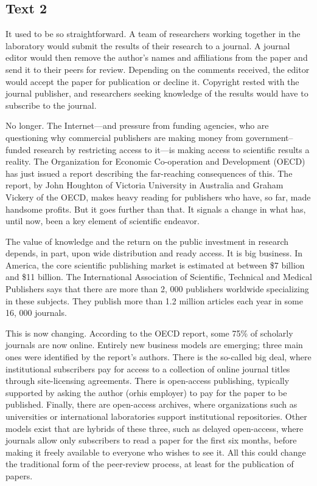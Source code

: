 \newpage
\subsection{Text 2}


It used to be so straightforward. A team of researchers working together
in the laboratory would submit the results of their research to a
journal. A journal editor would then remove the author's names and
affiliations from the paper and send it to their peers for review.
Depending on the comments received, the editor would accept the paper
for publication or decline it. Copyright rested with the journal
publisher, and researchers seeking knowledge of the results would have
to subscribe to the journal.

No longer. The Internet---and pressure from funding agencies, who are
questioning why commercial publishers are making money from
government--funded research by restricting access to it---is making
access to scientific results a reality. The Organization for Economic
Co-operation and Development (OECD) has just issued a report describing
the far-reaching consequences of this. The report, by John Houghton of
Victoria University in Australia and Graham Vickery of the OECD, makes
heavy reading for publishers who have, so far, made handsome profits.
But it goes further than that. It signals a change in what has, until
now, been a key element of scientific endeavor.

The value of knowledge and the return on the public investment in
research depends, in part, upon wide distribution and ready access. It
is big business. In America, the core scientific publishing market is
estimated at between \$7 billion and \$11 billion. The International
Association of Scientific, Technical and Medical Publishers says that
there are more than 2, 000 publishers worldwide specializing in these
subjects. They publish more than 1.2 million articles each year in some
16, 000 journals.

This is now changing. According to the OECD report, some 75\% of
scholarly journals are now online. Entirely new business models are
emerging; three main ones were identified by the report's authors. There
is the so-called big deal, where institutional subscribers pay for
access to a collection of online journal titles through site-licensing
agreements. There is open-access publishing, typically supported by
asking the author (orhis employer) to pay for the paper to be published.
Finally, there are open-access archives, where organizations such as
universities or international laboratories support institutional
repositories. Other models exist that are hybrids of these three, such
as delayed open-access, where journals allow only subscribers to read a
paper for the first six months, before making it freely available to
everyone who wishes to see it. All this could change the traditional
form of the peer-review process, at least for the publication of papers.

